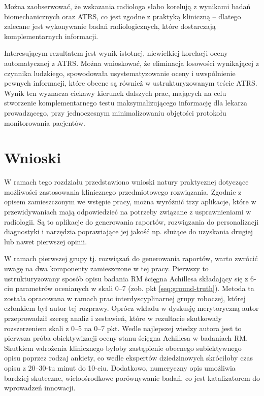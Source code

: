 Można zaobserwować, że wskazania radiologa słabo korelują z wynikami badań biomechanicznych oraz ATRS, co jest zgodne z praktyką kliniczną -- dlatego zalecane jest wykonywanie badań radiologicznych, które dostarczają komplementarnych informacji.

Interesującym rezultatem jest wynik istotnej, niewielkiej korelacji oceny automatycznej z ATRS. Można wnioskować, że eliminacja losowości wynikającej z czynnika ludzkiego, spowodowała usystematyzowanie oceny i uwspólnienie pewnych informacji, które obecne są również w ustrukturyzowanym teście ATRS. Wynik ten wyznacza ciekawy kierunek dalszych prac, mających na celu stworzenie komplementarnego testu maksymalizującego informację dla lekarza prowadzącego, przy jednoczesnym minimalizowaniu objętości protokołu monitorowania pacjentów.

\chapter{Wnioski}

W ramach tego rozdziału przedstawiono wnioski natury praktycznej dotyczące możliwości zastosowania klinicznego przedmiotowego rozwiązania. Zgodnie z opisem zamieszczonym we wstępie pracy, można wyróżnić trzy aplikacje, które w przewidywaniach mają odpowiedzieć na potrzeby związane z usprawnieniami w radiologii. Są to aplikacje do generowania raportów, rozwiązania do personalizacji diagnostyki i narzędzia poprawiające jej jakość np. służące do uzyskania drugiej lub nawet pierwszej opinii.

W ramach pierwszej grupy tj. rozwiązań do generowania raportów, warto zwrócić uwagę na dwa komponenty zamieszczone w tej pracy. Pierwszy to ustrukturyzowany sposób opisu badania RM ścięgna Achillesa składający się z 6-ciu parametrów ocenianych w skali 0--7 (zob. pkt \ref{seq:ground-truth}). Metoda ta została opracowana w ramach prac interdyscyplinarnej grupy roboczej, której członkiem był autor tej rozprawy. Oprócz wkładu w dyskusję merytoryczną autor przeprowadził szereg analiz i zestawień, które w rezultacie skutkowały rozszerzeniem skali z 0--5 na 0--7 pkt. Wedle najlepszej wiedzy autora jest to pierwsza próba obiektywizacji oceny stanu ścięgna Achillesa w badaniach RM. Skutkiem wdrożenia klinicznego byłoby zastąpienie obecnego subiektywnego opisu poprzez rodzaj ankiety, co wedle ekspertów dziedzinowych skróciłoby czas opisu z 20--30-tu minut do 10-ciu. Dodatkowo, numeryczny opis umożliwia bardziej skuteczne, wieloośrodkowe porównywanie badań, co jest katalizatorem do wprowadzeń innowacji. 

